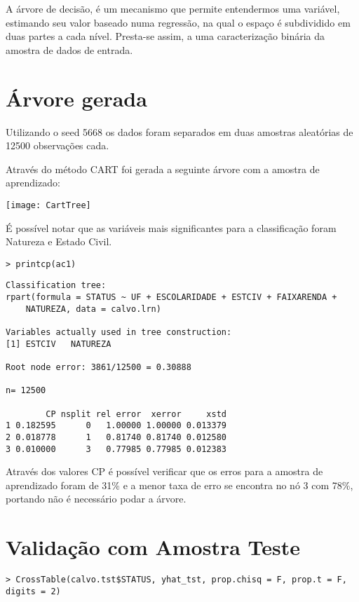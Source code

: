 A árvore de decisão, é um mecanismo que permite entendermos uma variável,
estimando seu valor baseado numa regressão, na qual o espaço é subdividido
em duas partes a cada nível. Presta-se assim, a uma caracterização
binária da amostra de dados de entrada.


\section{Árvore gerada}

Utilizando o seed 5668 os dados foram separados em duas amostras aleatórias
de 12500 observações cada.

Através do método CART foi gerada a seguinte árvore com a amostra
de aprendizado:

\begin{center}
\texttt{[image: CartTree]}
\par\end{center}

É possível notar que as variáveis mais significantes para a classificação
foram Natureza e Estado Civil. 

\begin{verbatim}
> printcp(ac1)
\end{verbatim}

\begin{lstlisting}
Classification tree:
rpart(formula = STATUS ~ UF + ESCOLARIDADE + ESTCIV + FAIXARENDA + 
    NATUREZA, data = calvo.lrn)
 
Variables actually used in tree construction:
[1] ESTCIV   NATUREZA
 
Root node error: 3861/12500 = 0.30888
 
n= 12500 
 
        CP nsplit rel error  xerror     xstd
1 0.182595      0   1.00000 1.00000 0.013379
2 0.018778      1   0.81740 0.81740 0.012580
3 0.010000      3   0.77985 0.77985 0.012383
\end{lstlisting}


Através dos valores CP é possível verificar que os erros para a amostra
de aprendizado foram de 31\% e a menor taxa de erro se encontra no
nó 3 com 78\%, portando não é necessário podar a árvore. 


\section{Validação com Amostra Teste}

\begin{verbatim}
> CrossTable(calvo.tst$STATUS, yhat_tst, prop.chisq = F, prop.t = F, digits = 2)
\end{verbatim}

